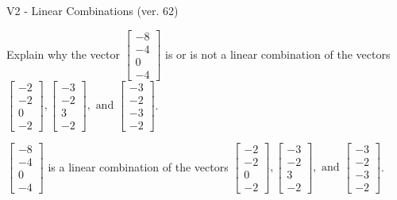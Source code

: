 \begin{exercise}
  \begin{exerciseTitle}V2 - Linear Combinations (ver. 62)\end{exerciseTitle}
  \begin{exerciseStatement}
    Explain why the vector \(\left[\begin{array}{c}
-8 \\
-4 \\
0 \\
-4
\end{array}\right]\)  is or is not a linear 
	combination of the vectors \(\left[\begin{array}{c}
-2 \\
-2 \\
0 \\
-2
\end{array}\right] , \left[\begin{array}{c}
-3 \\
-2 \\
3 \\
-2
\end{array}\right] , \text{ and } \left[\begin{array}{c}
-3 \\
-2 \\
-3 \\
-2
\end{array}\right]\).
	


  \end{exerciseStatement}
  \begin{exerciseAnswer}
   \(\left[\begin{array}{c}
-8 \\
-4 \\
0 \\
-4
\end{array}\right]\) 
  	 is  
	a linear combination of the vectors \(\left[\begin{array}{c}
-2 \\
-2 \\
0 \\
-2
\end{array}\right] , \left[\begin{array}{c}
-3 \\
-2 \\
3 \\
-2
\end{array}\right] , \text{ and } \left[\begin{array}{c}
-3 \\
-2 \\
-3 \\
-2
\end{array}\right]\).

	
  


  \end{exerciseAnswer}
\end{exercise}